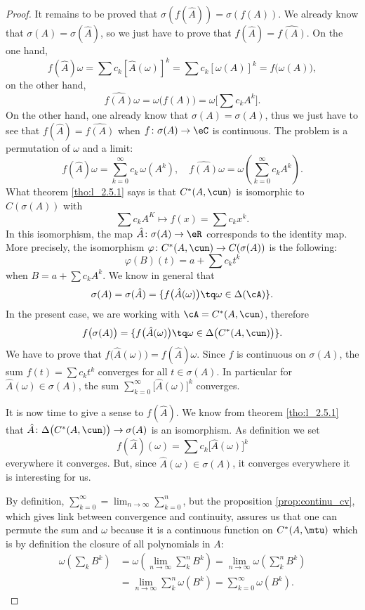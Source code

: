 \begin{proof}
It remains to be proved that $\sigma(f(\hat{A}))=\sigma(f(A))$. We already know that $\sigma(A)=\sigma(\hat{A})$, so we just have to prove that $f(\hat{A})=\widehat{ f(A) }$. On the one hand,
\[ 
 f(\hat{A})\omega=\sum c_k[\hat{A}(\omega)]^k
        =\sum c_k [\omega(A)]^k
        =f\big( \omega(A) \big),
\]
on the other hand,
\[ 
  \widehat{ f(A) }\omega=\omega\big( f(A) \big)=\omega\big[ \sum c_k A^k \big].
\]
On the other hand, one already know that $\sigma(A)=\sigma(A)$, thus we just have to see that 
$f(\hat A)=\widehat{f(A)}$ when $f\colon \sigma(A)\to \eC$ is continuous. The problem is a permutation of $\omega$ and a limit:
\[
 f(\hat A)\omega=\sum_{k=0}^{\infty} c_k\,\omega(A^k),\quad\widehat{f(A)}\omega=\omega\left(\sum_{k=0}^{\infty} c_kA^k\right).
\]
What theorem  \ref{tho:l_2.5.1} says is that $C^*(A,\cun)$ is isomorphic to $C(\sigma(A))$ with 
\[ 
  \sum c_kA^K\mapsto f(x)=\sum c_kx^k.
\]
 In this isomorphism, the map $\hat{A}\colon \sigma(A)\to \eR$ corresponds to the identity map. More precisely, the isomorphism $\varphi\colon C^*(A,\cun)\to C(\sigma(A))$ is the following:
\[ 
  \varphi(B)(t)=a+\sum c_kt^k
\]
when $B=a+\sum c_kA^k$. We know in general that
\[
\sigma(A)=\sigma(\hat{A})=\{ f\big( \hat{A}(\omega) \big)\tq\omega\in\Delta(\cA) \}.
\]
 In the present case, we are working with $\cA=C^*(A,\cun)$, therefore
\[ 
  f\big( \sigma(A) \big)=\{ f\big( \hat{A}(\omega) \big)\tq \omega\in\Delta\big( C^*(A,\cun) \big) \}.
\]
We have to prove that $f\big( \hat{A}(\omega) \big)=f(\hat{A})\omega$. Since $f$ is continuous on $\sigma(A)$, the sum $f(t)=\sum c_kt^k$ converges for all $t\in\sigma(A)$. In particular for $\hat{A}(\omega)\in\sigma(A)$, the sum $\sum_{k=0}^{\infty}\big[ \hat{A}(\omega) \big]^k$ converges.

It is now time to give a sense to $f(\hat{A})$. We know from theorem \ref{tho:l_2.5.1} that $\hat{A}\colon \Delta\big( C^*(A,\cun) \big) \to\sigma(A) $ is an isomorphism. As definition we set
 \begin{equation}
  f(\hat{A})(\omega)=\sum c_k\big[ \hat{A}(\omega) \big]^k
\end{equation}
everywhere it converges. But, since $\hat{A}(\omega)\in\sigma(A)$, it converges everywhere it is interesting for us.

By definition, $\sum_{k=0}^{\infty}=\lim_{n\to\infty}\sum_{k=0}^{n}$, but the proposition \ref{prop:continu_cv}, which gives link between convergence and continuity, assures us that one can permute the sum and $\omega$ because it is a continuous function on $C^*(A,\mtu)$ which is by definition the closure of all polynomials in $A$:
\begin{equation}
\begin{split}  
  \omega(\sum_k B^k)&=\omega(\lim_{n\to\infty}\sum_k^n B^k)
                    =\lim_{n\to\infty}\omega(\sum_k^n B^k)\\
            &=\lim_{n\to\infty}\sum_k^n\omega(B^k)
            =\sum_{k=0}^{\infty}\omega(B^k).
\end{split}         
\end{equation}



\end{proof}
